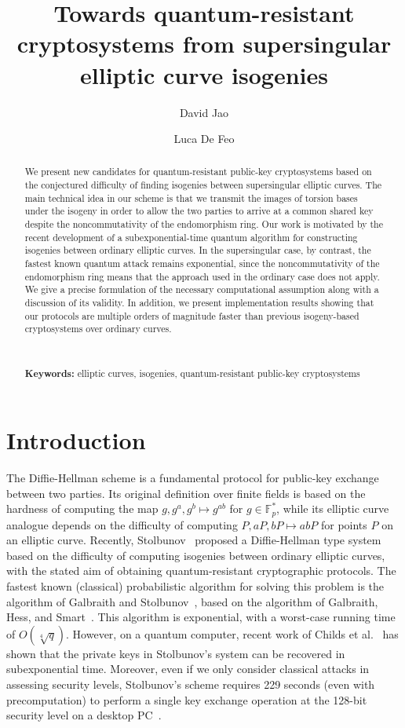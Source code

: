 \documentclass[envcountsect,envcountsame,runningheads]{llncs}   %
\title{Towards quantum-resistant cryptosystems
from supersingular elliptic curve isogenies}
\author{David Jao\inst{1} \and Luca De Feo\inst{2}}
\institute{
Department of Combinatorics and Optimization \\
University of Waterloo, Waterloo, Ontario, N2L 3G1, Canada\\
\email{djao@math.uwaterloo.ca}\\[\baselineskip]
\and
Laboratoire PRiSM\\
Universit\'e de Versailles, 78035 Versailles, France\\
\email{http://www.prism.uvsq.fr/\homedir dfl}
}
\newcommand{\FF}{{\mathbb{F}}}
\begin{document}
\maketitle 
 
\begin{abstract}
We present new candidates for quantum-resistant public-key
cryptosystems based on the conjectured difficulty of finding isogenies
between supersingular elliptic curves.  The main technical idea in our
scheme is that we transmit the images of torsion bases under the isogeny
in order to allow the two parties to arrive at a common shared key
despite the noncommutativity of the endomorphism ring.  Our work is
motivated by the recent development of a subexponential-time quantum
algorithm for constructing isogenies between ordinary elliptic curves.
In the supersingular case, by contrast, the fastest known quantum attack
remains exponential, since the noncommutativity of the endomorphism ring
means that the approach used in the ordinary case does not apply. We
give a precise formulation of the necessary computational assumption
along with a discussion of its validity. In addition, we present implementation
results showing that our protocols are multiple orders of magnitude faster
than previous isogeny-based cryptosystems over ordinary curves.

\ 

\textbf{Keywords:} elliptic curves, isogenies, quantum-resistant public-key cryptosystems
\end{abstract}

\section{Introduction}

The Diffie-Hellman scheme is a fundamental protocol for public-key
exchange between two parties. Its original definition over finite
fields is based on the hardness of computing the map $g,g^a,g^b
\mapsto g^{ab}$ for $g \in \FF_p^*$, while its elliptic curve analogue
depends on the difficulty of computing $P,aP,bP \mapsto abP$ for
points $P$ on an elliptic curve. Recently, Stolbunov~\cite{Stol}
proposed a Diffie-Hellman type system based on the difficulty of
computing isogenies between ordinary elliptic curves, with the stated
aim of obtaining quantum-resistant cryptographic protocols.  The
fastest known (classical) probabilistic algorithm for solving this
problem is the algorithm of Galbraith and Stolbunov~\cite{gs}, based
on the algorithm of Galbraith, Hess, and Smart~\cite{GHS}. This
algorithm is exponential, with a worst-case running time of
$O(\sqrt[4]{q})$. However, on a quantum computer, recent work of
Childs et al.~\cite{CJS} has shown that the private keys in Stolbunov's
system can be recovered in subexponential time. Moreover, even if
we only consider classical attacks in assessing security levels, Stolbunov's
scheme requires 229 seconds (even with precomputation) to perform a
single key exchange operation at the 128-bit security level on a
desktop PC~\cite[Table 1]{Stol}.
\end{document}
